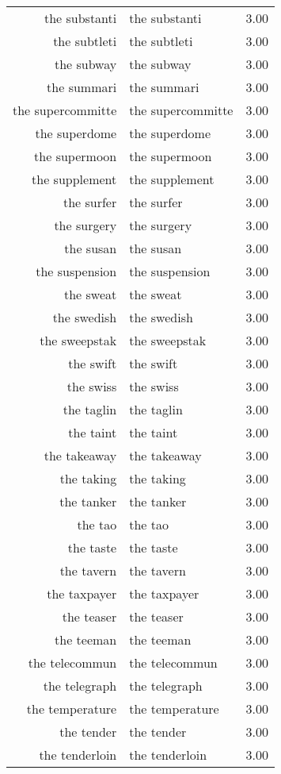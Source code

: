 \begin{table}[ht]
\begin{tabular}{rlr}
  the substanti & the substanti & 3.00 \\ 
  the subtleti & the subtleti & 3.00 \\ 
  the subway & the subway & 3.00 \\ 
  the summari & the summari & 3.00 \\ 
  the supercommitte & the supercommitte & 3.00 \\ 
  the superdome & the superdome & 3.00 \\ 
  the supermoon & the supermoon & 3.00 \\ 
  the supplement & the supplement & 3.00 \\ 
  the surfer & the surfer & 3.00 \\ 
  the surgery & the surgery & 3.00 \\ 
  the susan & the susan & 3.00 \\ 
  the suspension & the suspension & 3.00 \\ 
  the sweat & the sweat & 3.00 \\ 
  the swedish & the swedish & 3.00 \\ 
  the sweepstak & the sweepstak & 3.00 \\ 
  the swift & the swift & 3.00 \\ 
  the swiss & the swiss & 3.00 \\ 
  the taglin & the taglin & 3.00 \\ 
  the taint & the taint & 3.00 \\ 
  the takeaway & the takeaway & 3.00 \\ 
  the taking & the taking & 3.00 \\ 
  the tanker & the tanker & 3.00 \\ 
  the tao & the tao & 3.00 \\ 
  the taste & the taste & 3.00 \\ 
  the tavern & the tavern & 3.00 \\ 
  the taxpayer & the taxpayer & 3.00 \\ 
  the teaser & the teaser & 3.00 \\ 
  the teeman & the teeman & 3.00 \\ 
  the telecommun & the telecommun & 3.00 \\ 
  the telegraph & the telegraph & 3.00 \\ 
  the temperature & the temperature & 3.00 \\ 
  the tender & the tender & 3.00 \\ 
  the tenderloin & the tenderloin & 3.00 \\ 

\end{tabular}
\end{table}

